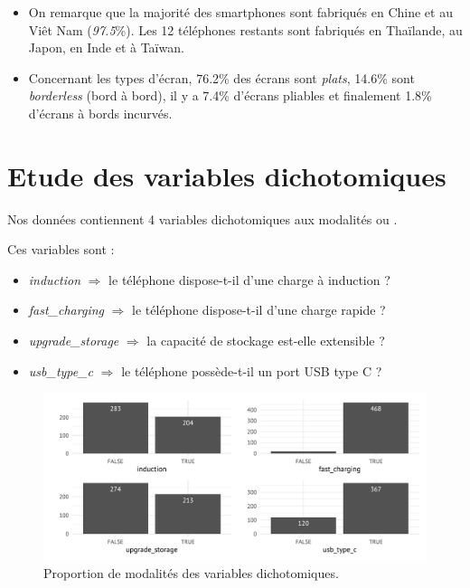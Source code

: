 \documentclass[
  12pt,
]{report}
\providecommand{\tightlist}{%
  \setlength{\itemsep}{0pt}\setlength{\parskip}{0pt}}\usepackage{longtable,booktabs,array}
\renewcommand{\texttt}[1]{\colorbox{light}{\color{highlight}{\ttfamily{#1}}}}
\begin{document}
\begin{itemize}
\item
  On remarque que la majorité des smartphones sont fabriqués en Chine et
  au Viêt Nam (\emph{97.5}\%). Les 12 téléphones restants sont fabriqués
  en Thaïlande, au Japon, en Inde et à Taïwan.
\item
  Concernant les types d'écran, 76.2\% des écrans sont \emph{plats},
  14.6\% sont \emph{borderless} (bord à bord), il y a 7.4\% d'écrans
  pliables et finalement 1.8\% d'écrans à bords incurvés.
\end{itemize}

\newpage

\section{Etude des variables
dichotomiques}\label{etude-des-variables-dichotomiques}

Nos données contiennent 4 variables dichotomiques aux modalités
\texttt{TRUE} ou \texttt{FALSE}.

Ces variables sont :

\begin{itemize}
\tightlist
\item
  \emph{induction} \(\Rightarrow\) le téléphone dispose-t-il d'une
  charge à induction ?
\item
  \emph{fast\_charging} \(\Rightarrow\) le téléphone dispose-t-il d'une
  charge rapide ?
\item
  \emph{upgrade\_storage} \(\Rightarrow\) la capacité de stockage
  est-elle extensible ?
\item
  \emph{usb\_type\_c} \(\Rightarrow\) le téléphone possède-t-il un port
  USB type C ?
\end{itemize}

\begin{figure}[H]

{\centering \includegraphics{report_files/figure-pdf/binary_vars-1.pdf}

}

\caption{Proportion de modalités des variables dichotomiques.}

\end{figure}%
\end{document}
